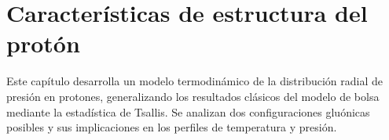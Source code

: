 \chapter{Características de estructura del protón}\label{ch-ProtonStructureCh}

\fancyhf{} %

\begin{abstractbox}
    Este capítulo desarrolla un modelo termodinámico de la distribución radial de presión en protones, generalizando los resultados clásicos del modelo de bolsa mediante la estadística de Tsallis. Se analizan dos configuraciones gluónicas posibles y sus implicaciones en los perfiles de temperatura y presión.
\end{abstractbox}



